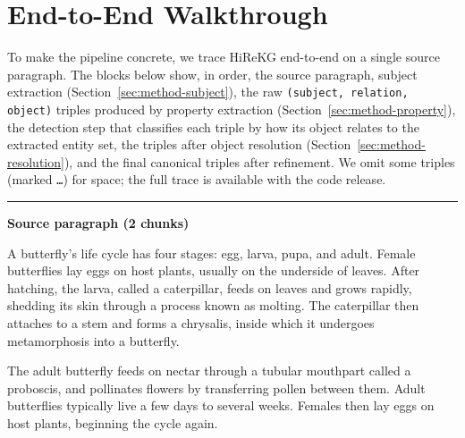 \documentclass[11pt]{article}
\begin{document}
\newcommand{\stageblock}[2]{%
  \par\vspace{0.5\baselineskip}%
  \noindent\rule{\linewidth}{0.6pt}\par
  \noindent\textbf{#1}\par
  \vspace{0.15\baselineskip}%
  \begingroup
    \footnotesize
    \setlength{\parskip}{0pt}%
    \setlength{\leftskip}{0.5em}%
    #2
  \endgroup
  \par\vspace{0.25\baselineskip}%
}

\newcommand{\substage}[1]{\par\vspace{0.15\baselineskip}\noindent\emph{#1}\par}

\section{End-to-End Walkthrough}
\label{app:walkthrough}

To make the pipeline concrete, we trace HiReKG end-to-end on a single source paragraph. The blocks below show, in order, the source paragraph, subject extraction (Section~\ref{sec:method-subject}), the raw \texttt{(subject, relation, object)} triples produced by property extraction (Section~\ref{sec:method-property}), the detection step that classifies each triple by how its object relates to the extracted entity set, the triples after object resolution (Section~\ref{sec:method-resolution}), and the final canonical triples after refinement. We omit some triples (marked \texttt{\dots}) for space; the full trace is available with the code release.

\stageblock{Source paragraph (2 chunks)}{%
A butterfly's life cycle has four stages: egg, larva, pupa, and adult. Female butterflies lay eggs on host plants, usually on the underside of leaves. After hatching, the larva, called a caterpillar, feeds on leaves and grows rapidly, shedding its skin through a process known as molting. The caterpillar then attaches to a stem and forms a chrysalis, inside which it undergoes metamorphosis into a butterfly.\par
The adult butterfly feeds on nectar through a tubular mouthpart called a proboscis, and pollinates flowers by transferring pollen between them. Adult butterflies typically live a few days to several weeks. Females then lay eggs on host plants, beginning the cycle again.%
}
\end{document}
